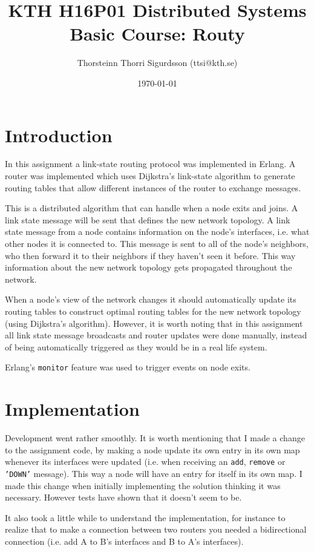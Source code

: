 \documentclass[a4paper, 11pt]{article}
\title{KTH H16P01 Distributed Systems Basic Course: Routy}
\author{Thorsteinn Thorri Sigurdsson (ttsi@kth.se)}
\date{\today{}}
\begin{document}
\maketitle

\section{Introduction}

In this assignment a link-state routing protocol was implemented in Erlang. A router was implemented which uses Dijkstra's link-state algorithm to generate routing tables that allow different instances of the router to exchange messages.

This is a distributed algorithm that can handle when a node exits and joins. A link state message will be sent that defines the new network topology. A link state message from a node contains information on the node's interfaces, i.e. what other nodes it is connected to. This message is sent to all of the node's neighbors, who then forward it to their neighbors if they haven't seen it before. This way information about the new network topology gets propagated throughout the network.

When a node's view of the network changes it should automatically update its routing tables to construct optimal routing tables for the new network topology (using Dijkstra's algorithm). However, it is worth noting that in this assignment all link state message broadcasts and router updates were done manually, instead of being automatically triggered as they would be in a real life system.

Erlang's \texttt{monitor} feature was used to trigger events on node exits.

\section{Implementation}

Development went rather smoothly. It is worth mentioning that I made a change to the assignment code, by making a node update its own entry in its own map whenever its interfaces were updated (i.e. when receiving an \texttt{add}, \texttt{remove} or \texttt{'DOWN'} message). This way a node will have an entry for itself in its own map. I made this change when initially implementing the solution thinking it was necessary. However tests have shown that it doesn't seem to be.

It also took a little while to understand the implementation, for instance to realize that to make a connection between two routers you needed a bidirectional connection (i.e. add A to B's interfaces and B to A's interfaces).
\end{document}
